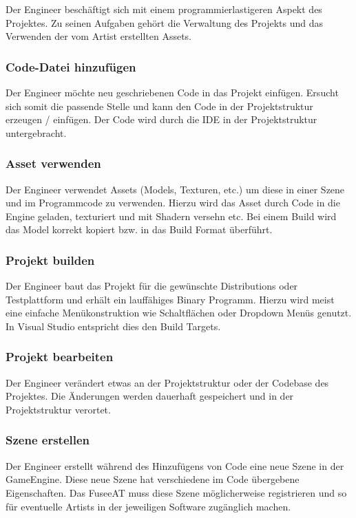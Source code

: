 \documentclass[pagesize, paper=a4, fontsize=12pt, titlepage=true, headings=small, headnosepline, abstractoff, liststotoc, nochapterprefix, plainheadsepline, twoside]{scrreprt}
\begin{document}
Der Engineer beschäftigt sich mit einem programmierlastigeren Aspekt des Projektes. Zu seinen Aufgaben gehört die Verwaltung des Projekts und das Verwenden der vom Artist erstellten Assets.

\subsubsection{Code-Datei hinzufügen}
Der Engineer möchte neu geschriebenen Code in das Projekt einfügen. Ersucht sich somit die passende Stelle und kann den Code in der Projektstruktur erzeugen / einfügen. Der Code wird durch die IDE in der Projektstruktur untergebracht.

\subsubsection{Asset verwenden}
Der Engineer verwendet Assets (Models, Texturen, etc.) um diese in einer Szene und im Programmcode zu verwenden. Hierzu wird das Asset durch Code in die Engine geladen, texturiert und mit Shadern versehn etc. Bei einem Build wird das Model korrekt kopiert bzw. in das Build Format überführt.

\subsubsection{Projekt builden}
Der Engineer baut das Projekt für die gewünschte Distributions oder Testplattform und erhält ein lauffähiges Binary Programm. Hierzu wird meist eine einfache Menükonstruktion wie Schaltflächen oder Dropdown Menüs genutzt. In Visual Studio entspricht dies den Build Targets.

\subsubsection{Projekt bearbeiten}
Der Engineer verändert etwas an der Projektstruktur oder der Codebase des Projektes. Die Änderungen werden dauerhaft gespeichert und in der Projektstruktur verortet.

\subsubsection{Szene erstellen}
Der Engineer erstellt während des Hinzufügens von Code eine neue Szene in der GameEngine. Diese neue Szene hat verschiedene im Code übergebene Eigenschaften. Das FuseeAT muss diese Szene möglicherweise registrieren und so für eventuelle Artists in der jeweiligen Software zugänglich machen.
\end{document}

